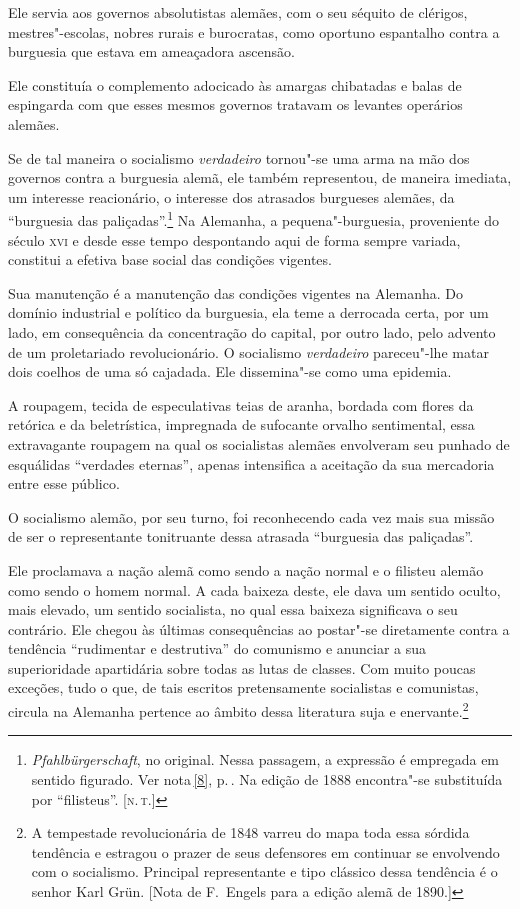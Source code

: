 Ele servia aos governos absolutistas alemães, com o seu séquito de
clérigos, mestres"-escolas, nobres rurais e burocratas, como oportuno
espantalho contra a burguesia que estava em ameaçadora ascensão.

Ele constituía o complemento adocicado às amargas chibatadas e balas de
espingarda com que esses mesmos governos tratavam os levantes operários
alemães.

Se de tal maneira o socialismo \textit{verdadeiro} tornou"-se uma arma
na mão dos governos contra a burguesia alemã, ele também representou,
de maneira imediata, um interesse reacionário, o interesse dos
atrasados burgueses alemães, da ``burguesia das paliçadas''.\footnote{\textit
{Pfahlbürgerschaft}, no original. Nessa passagem, a expressão é empregada
em sentido figurado. Ver nota\,\ref{8}, p.\,\pageref{8}. Na edição de 1888 encontra"-se substituída 
por ``filisteus''. [\textsc{n.\,t.}]} Na Alemanha, a pequena"-burguesia, 
proveniente do século \textsc{xvi} e desde esse tempo despontando aqui de forma sempre 
variada, constitui a efetiva base social das condições vigentes.

Sua manutenção é a manutenção das condições vigentes na Alemanha. Do
domínio industrial e político da burguesia, ela teme a derrocada certa,
por um lado, em consequência da concentração do capital, por outro lado,
pelo advento de um proletariado revolucionário. O socialismo
\textit{verdadeiro} pareceu"-lhe matar dois coelhos de uma só cajadada. Ele
dissemina"-se como uma epidemia.

A roupagem, tecida de especulativas teias de aranha, bordada com flores
da retórica e da beletrística, impregnada de sufocante orvalho
sentimental, essa extravagante roupagem na qual os socialistas alemães
envolveram seu punhado de esquálidas ``verdades eternas'', apenas
intensifica a aceitação da sua mercadoria entre esse público.

O socialismo alemão, por seu turno, foi reconhecendo cada vez mais sua
missão de ser o representante tonitruante dessa atrasada ``burguesia das
paliçadas''.

Ele proclamava a nação alemã como sendo a nação normal e o
filisteu alemão como sendo o homem normal. A cada baixeza deste, ele
dava um sentido oculto, mais elevado, um sentido socialista, no qual
essa baixeza significava o seu contrário. Ele chegou às últimas
consequências ao postar"-se diretamente contra a tendência ``rudimentar
e destrutiva'' do comunismo e anunciar a sua superioridade apartidária
sobre todas as lutas de classes. Com muito poucas exceções, tudo o que,
de tais escritos pretensamente socialistas e comunistas, circula na
Alemanha pertence ao âmbito dessa literatura suja e enervante.\footnote{ A 
tempestade revolucionária de 1848 varreu do mapa toda essa sórdida 
tendência e estragou o prazer de seus defensores em continuar se envolvendo
com o socialismo. Principal representante e tipo clássico dessa tendência é
o senhor Karl Grün. [Nota de F.~Engels para a edição alemã de 1890.]}

